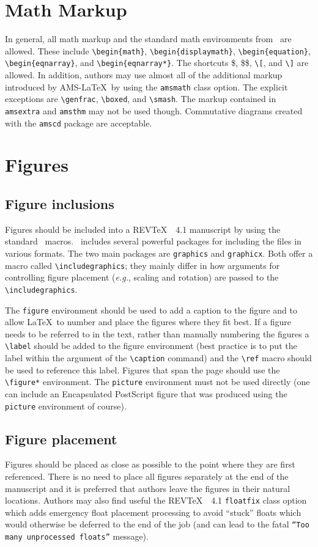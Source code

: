 \documentclass[twocolumn,secnumarabic,amssymb, nobibnotes, aps, prd]{revtex4-1}
\newcommand{\revtex}{REV\TeX\ }
\newcommand{\classoption}[1]{\texttt{#1}}
\newcommand{\macro}[1]{\texttt{\textbackslash#1}}
\newcommand{\m}[1]{\macro{#1}}
\newcommand{\env}[1]{\texttt{#1}}
\begin{document}
\section{Math Markup}
In general, all math markup and the standard math environments from
\LaTeXe\ are allowed. These include \m{begin\{math\}},
\m{begin\{displaymath\}}, \m{begin\{equation\}},
\m{begin\{eqnarray\}}, and \m{begin\{eqnarray*\}}. The shortcuts \$,
\$\$, \m{[}, and \m{]} are allowed. In addition, authors may use
almost all of the additional markup introduced by AMS-\LaTeX\ by using
the \classoption{amsmath} class option. The explicit exceptions are
\m{genfrac}, \m{boxed}, and \m{smash}. The markup contained in
\texttt{amsextra} and \texttt{amsthm} may not be used
though. Commutative diagrams created with the \texttt{amscd} package
are acceptable.

\section{Figures}
\subsection{Figure inclusions}
Figures should be included into a \revtex~4.1 manuscript by using the
standard \LaTeXe\ macros. \LaTeXe\ includes
several powerful packages for including the files in various
formats. The two main packages are \texttt{graphics} and
\texttt{graphicx}. Both offer a macro called
\m{includegraphics};
they mainly differ in how arguments for
controlling figure placement (\textit{e.g.}, scaling and rotation)
are passed to the \m{includegraphics}.

The \env{figure} environment should be used to add a caption to the
figure and to allow \LaTeX\ to number and place the figures where they
fit best.  If a figure needs to be referred to in the text,
rather than manually numbering the figures a \m{label} should be added
to the figure environment (best practice is to put the label within
the argument of the \m{caption} command) and the \m{ref} macro should be used to
reference this label. Figures that span the page should use the
\m{figure*} environment. The \env{picture} environment must not be
used directly (one can include an Encapsulated PostScript figure that
was produced using the \env{picture} environment of course).

\subsection{\label{sec:figplace}Figure placement}
Figures should be placed as close as possible to the point where they are first
referenced. There is no need to place all figures
separately at the end of the manuscript and it is preferred that
authors leave the figures in their natural locations. Authors may
also find useful the \revtex~4.1 \classoption{floatfix} class option
which adds emergency float placement processing to avoid ``stuck''
floats which would otherwise be deferred to the end of the job (and
can lead to the fatal \texttt{``Too many unprocessed floats''}
message).
\end{document}
